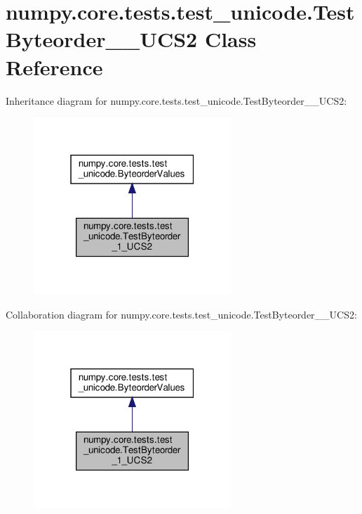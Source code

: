 \hypertarget{classnumpy_1_1core_1_1tests_1_1test__unicode_1_1TestByteorder__1__UCS2}{}\section{numpy.\+core.\+tests.\+test\+\_\+unicode.\+Test\+Byteorder\+\_\+\_\+\+U\+C\+S2 Class Reference}
\label{classnumpy_1_1core_1_1tests_1_1test__unicode_1_1TestByteorder__1__UCS2}


Inheritance diagram for numpy.\+core.\+tests.\+test\+\_\+unicode.\+Test\+Byteorder\+\_\+\_\+\+U\+C\+S2\+:
\nopagebreak
\begin{figure}[H]
\begin{center}
\leavevmode
\includegraphics[width=211pt]{classnumpy_1_1core_1_1tests_1_1test__unicode_1_1TestByteorder__1__UCS2__inherit__graph}
\end{center}
\end{figure}


Collaboration diagram for numpy.\+core.\+tests.\+test\+\_\+unicode.\+Test\+Byteorder\+\_\+\_\+\+U\+C\+S2\+:
\nopagebreak
\begin{figure}[H]
\begin{center}
\leavevmode
\includegraphics[width=211pt]{classnumpy_1_1core_1_1tests_1_1test__unicode_1_1TestByteorder__1__UCS2__coll__graph}
\end{center}
\end{figure}
